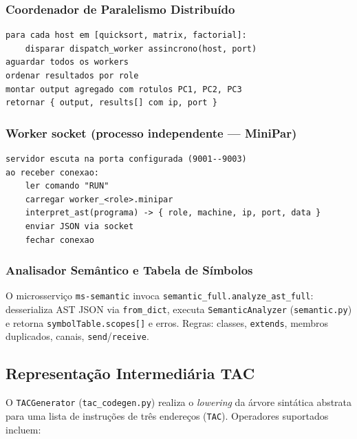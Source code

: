\documentclass[12pt]{article}
\begin{document}
\subsubsection{Coordenador de Paralelismo Distribuído}
\begin{lstlisting}[caption={Pseudocodigo ms-parallel-coord /coordinate (modo legado)}]
para cada host em [quicksort, matrix, factorial]:
    disparar dispatch_worker assincrono(host, port)
aguardar todos os workers
ordenar resultados por role
montar output agregado com rotulos PC1, PC2, PC3
retornar { output, results[] com ip, port }
\end{lstlisting}

\subsubsection{Worker socket (processo independente --- MiniPar)}
\begin{lstlisting}[caption={Worker: interpreta programa MiniPar (parallel-workers/app/main.py)}]
servidor escuta na porta configurada (9001--9003)
ao receber conexao:
    ler comando "RUN"
    carregar worker_<role>.minipar
    interpret_ast(programa) -> { role, machine, ip, port, data }
    enviar JSON via socket
    fechar conexao
\end{lstlisting}

\subsubsection{Analisador Semântico e Tabela de Símbolos}
O microsserviço \texttt{ms-semantic} invoca \texttt{semantic\_full.analyze\_ast\_full}: desserializa AST JSON via \texttt{from\_dict}, executa \texttt{SemanticAnalyzer} (\texttt{semantic.py}) e retorna \texttt{symbolTable.scopes[]} e erros. Regras: classes, \texttt{extends}, membros duplicados, canais, \texttt{send}/\texttt{receive}.

\subsection{Representação Intermediária TAC}

O \texttt{TACGenerator} (\texttt{tac\_codegen.py}) realiza o \emph{lowering} da árvore sintática abstrata para uma lista de instruções de três endereços (\texttt{TAC}). Operadores suportados incluem:
\end{document}
